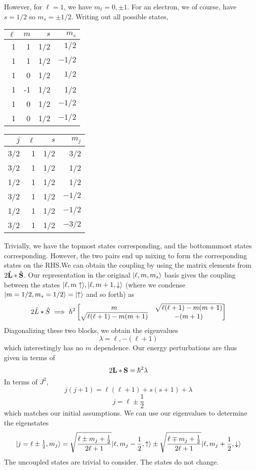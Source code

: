 However, for \(\ell = 1\), we have \(m_\ell = 0,\pm 1\). For an electron, we of course, have \(s = 1/2\) so \(m_s = \pm 1/2\). Writing out all possible states,
\begin{multicols}{2}
	\noindent \begin{center}
		\begin{tabular}{r|r|r|r}
			\(\ell\) & \(m\) & \(s\) & \(m_s\)\\
			\hline\hline
			1 & 1 & 1/2 & \(1/2\)\\
			\hline
			1 & 1 & 1/2 & \(-1/2\)\\
			1 & 0 & 1/2 & \(1/2\)\\
			\hline
			1 & -1 & 1/2 & 1/2 \\
			1 &  0 & 1/2 & \(-1/2\)\\
			\hline
			1 & 0 & 1/2 & \(-1/2\)
		\end{tabular}
	\end{center}
	\hphantom{i}
	\begin{center}
		\begin{tabular}{r|r|r|r}
			\(j\) & \(\ell\) & \(s\) & \(m_j\)\\
			\hline\hline
			3/2 & 1 & 1/2 & 3/2\\
			\hline
			3/2 & 1 & 1/2 & 1/2\\
			1/2 & 1 & 1/2 & 1/2\\
			\hline
			3/2 & 1 & 1/2 & \(-1/2\)\\
			1/2 & 1 & 1/2 & \(-1/2\)\\
			\hline
			3/2 & 1 & 1/2 & \(-3/2\)
		\end{tabular}
	\end{center}
\end{multicols}
Trivially, we have the topmost states corresponding, and the bottommmost states corresponding. However, the two pairs end up mixing to form the corresponding states on the RHS.\@ We can obtain the coupling by using the matrix elements from \(2\hat{\mathbf{L}}*\hat{\mathbf{S}}\). Our representation in the original \(\lvert\ell, m, m_s\rangle\) basis gives the coupling between the states \(\lvert\ell, m \uparrow\rangle,\lvert\ell,m+1,\downarrow\rangle\) (where we condense \(\lvert m=1/2, m_s=1/2\rangle = \lvert\uparrow\rangle\) and so forth)  as
\[2\hat L * \hat S \implies \hbar^2 \begin{bmatrix}
	m & \sqrt{\ell(\ell+1)-m(m+1)} \\
	\sqrt{\ell(\ell+1)-m(m+1)}  & -(m+1)
\end{bmatrix}\]
Diagonalizing these two blocks, we obtain the eigenvalues
\[\lambda = \ell, -(\ell+1)\]
which interestingly has no \(m\) dependence. Our energy perturbations are thus given in terms of
\[2\mathbf{L}*\mathbf{S} = \hbar^2\lambda\]
In terms of \(J^2\),
\[j(j+1) = \ell(\ell+1)+s(s+1)+\lambda\]
\[j = \ell\pm\frac{1}{2}\]
which matches our initial assumptions. We can use our eigenvalues to determine the eigenstates
\begin{equation}
	\lvert j=\ell\pm \tfrac{1}{2},m_j\rangle = \sqrt{\frac{\ell\pm m_j+\frac{1}{2}}{2\ell+1}}\lvert\ell,m_j-\frac{1}{2},\uparrow\rangle\pm\sqrt{\frac{\ell\mp m_j+\frac{1}{2}}{2\ell+1}}\lvert\ell,m_j+\frac{1}{2},\downarrow\rangle
\end{equation}
The uncoupled states are trivial to consider. The states do not change.

